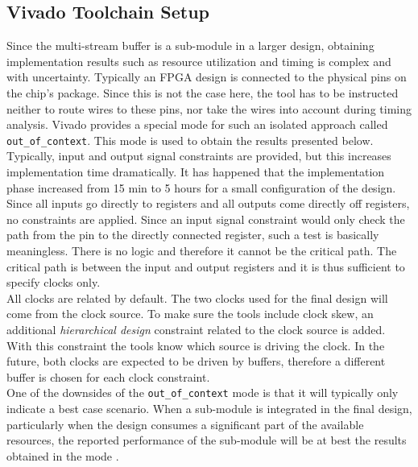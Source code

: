 \subsection{Vivado Toolchain Setup}
Since the multi-stream buffer is a sub-module in a larger design, obtaining implementation results such as resource utilization and timing is complex and with uncertainty. Typically an FPGA design is connected to the physical pins on the chip's package. Since this is not the case here, the tool has to be instructed neither to route wires to these pins, nor take the wires into account during timing analysis. Vivado provides a special mode for such an isolated approach called \texttt{out\_of\_context}. This mode is used to obtain the results presented below.\\
Typically, input and output signal constraints are provided, but this increases implementation time dramatically. It has happened that the implementation phase increased from 15 min to 5 hours for a small configuration of the design. Since all inputs go directly to registers and all outputs come directly off registers, no constraints are applied. Since an input signal constraint would only check the path from the pin to the directly connected register, such a test is basically meaningless. There is no logic and therefore it cannot be the critical path. The critical path is between the input and output registers and it is thus sufficient to specify clocks only.\\
All clocks are related by default. The two clocks used for the final design will come from the clock source. To make sure the tools include clock skew, an additional \textit{hierarchical design} constraint related to the clock source is added. With this constraint the tools know which source is driving the clock. In the future, both clocks are expected to be driven by buffers, therefore a different buffer is chosen for each clock constraint.\\
One of the downsides of the \texttt{out\_of\_context} mode is that it will typically only indicate a best case scenario. When a sub-module is integrated in the final design, particularly when the design consumes a significant part of the available resources, the reported performance of the sub-module will be at best the results obtained in the  mode \cite{xilinx-forum}.



